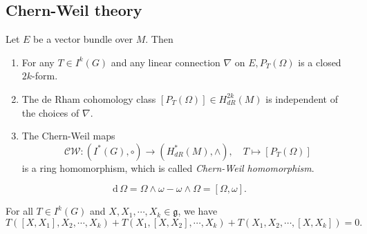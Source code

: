 \documentclass[11pt]{homework}
\theoremstyle{indented}
\begin{document}
\subsection{Chern-Weil theory}

\begin{theorem}
    \label{thm:chern_weil}
    Let $E$ be a vector bundle over $M$. Then
    \begin{enumerate}
        \item For any $T \in I^{k}(G)$ and any linear connection $\nabla$ on $E, P_{T}\left(\Omega\right)$ is a closed $2 k$-form.
        \item The de Rham cohomology class $\left[P_{T}\left(\Omega\right)\right] \in H_{d R}^{2 k}(M)$ is independent of the choices of $\nabla$.
        \item The Chern-Weil maps
        \begin{equation*}
            \mathcal{C W}:\left(I^{*}(G), \circ\right) \to\left(H_{dR}^{*}(M), \wedge\right), \quad T \mapsto\left[P_{T}\left(\Omega\right)\right]
        \end{equation*}
        is a ring homomorphism, which is called \textit{Chern-Weil homomorphism}.
    \end{enumerate}
\end{theorem}

\begin{lemma}
    \begin{equation*}
        \mathrm d \, \Omega = \Omega \wedge \omega - \omega \wedge \Omega = [\Omega, \omega].
    \end{equation*}
\end{lemma}
\begin{lemma}
    For all $T \in I^{k}(G)$ and $X, X_1, \cdots, X_k \in \mathfrak{g}$, we have
    \begin{equation*}
        T([X,X_1], X_2, \cdots, X_k ) + T(X_1, [X,X_2], \cdots, X_k ) + T(X_1, X_2, \cdots, [X, X_k]) = 0.
    \end{equation*}
\end{lemma}
\end{document}
